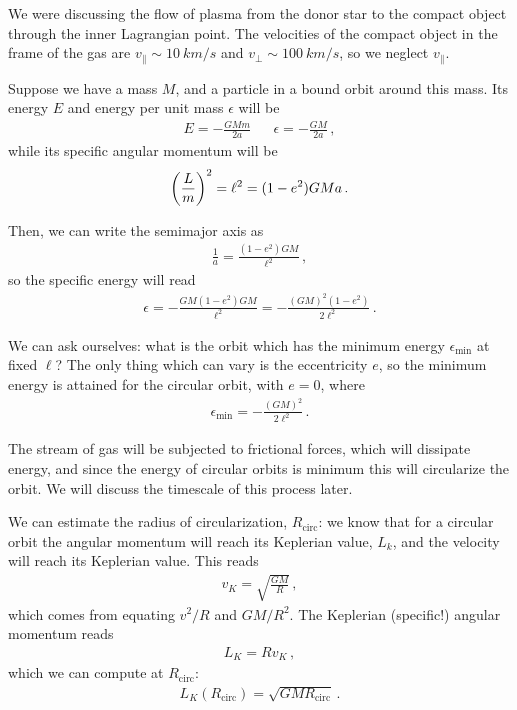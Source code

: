 \documentclass[main.tex]{subfiles}
\begin{document}

We were discussing the flow of plasma from the donor star to the compact object through the inner Lagrangian point.
The velocities of the compact object in the frame of the gas are \(v_\parallel \sim \SI{10}{km/s}\) and \(v_\perp \sim \SI{100}{km/s}\), so we neglect \(v_{\parallel}\).

Suppose we have a mass \(M\), and a particle in a bound orbit around this mass.
Its energy \(E\) and energy per unit mass \(\epsilon \) will be 
%
\begin{align}
E = - \frac{GMm}{2a} && \epsilon = - \frac{GM}{2a} 
\,,
\end{align}
%
while its specific angular momentum will be 
%
\begin{align}
\qty( \frac{L}{m})^2 = \ell^2 = (1 - e^2) GMa
\,.
\end{align}

Then, we can write the semimajor axis as 
%
\begin{align}
\frac{1}{a} = \frac{(1-e^2) GM}{\ell^2}
\,,
\end{align}
%
so the specific energy will read
\begin{align}
\epsilon = - \frac{GM (1-e^2) GM}{\ell^2}= - \frac{(GM)^2(1-e^2)}{2 \ell^2}
\,.
\end{align}

We can ask ourselves: what is the orbit which has the minimum energy \(\epsilon _{\text{min}}\) at fixed \(\ell\)? The only thing which can vary is the eccentricity \(e\), so the minimum energy is attained for the circular orbit, with \(e = 0\), where 
%
\begin{align}
\epsilon _{\text{min}} = -\frac{(GM)^2}{2 \ell^2}
\,.
\end{align}

The stream of gas will be subjected to frictional forces, which will dissipate energy, and since the energy of circular orbits is minimum this will circularize the orbit. 
We will discuss the timescale of this process later.

We can estimate the radius of circularization, \(R _{\text{circ}}\): we know that for a circular orbit the angular momentum will reach its Keplerian value, \(L_k\), and the velocity will reach its Keplerian value. 
This reads 
%
\begin{align}
v_K = \sqrt{ \frac{GM}{R}} 
\,,
\end{align}
%
which comes from equating \(v^2 /R\) and \(GM/ R^2\).
The Keplerian (specific!) angular momentum reads 
%
\begin{align}
L_K = R v_K 
\,,
\end{align}
%
which we can compute at \(R _{\text{circ}}\): 
%
\begin{align}
L_K (R _{\text{circ}}) = \sqrt{GM R _{\text{circ}}}
\,.
\end{align}
\end{document}
